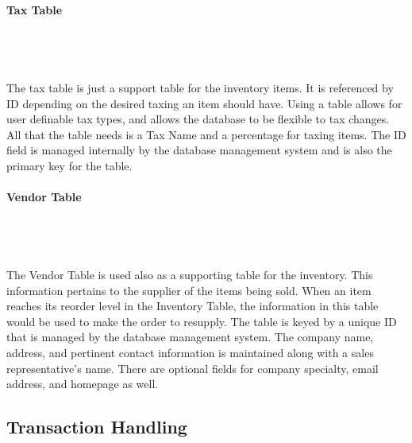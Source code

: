 \documentclass{report}
\begin{document}
        {\bf Tax Table}\\
        \\
        \\
        \\
        \\
        The tax table is just a support table for the inventory items. It is referenced by ID
        depending on the desired taxing an item should have. Using a table allows for user definable
        tax types, and allows the database to be flexible to tax changes. All that the table needs
        is a Tax Name and a percentage for taxing items. The ID field is managed internally by the
        database management system and is also the primary key for the table.\\
        \\
        {\bf Vendor Table}\\
        \\
        \\
        \\
        \\
        The Vendor Table is used also as a supporting table for the inventory. This information
        pertains to the supplier of the items being sold. When an item reaches its reorder level
        in the Inventory Table, the information in this table would be used to make the order to
        resupply. The table is keyed by a unique ID that is managed by the database management
        system. The company name, address, and pertinent contact information is maintained along
        with a sales representative's name. There are optional fields for company specialty, email
        address, and homepage as well.

        \subsection{Transaction Handling}
\end{document}
